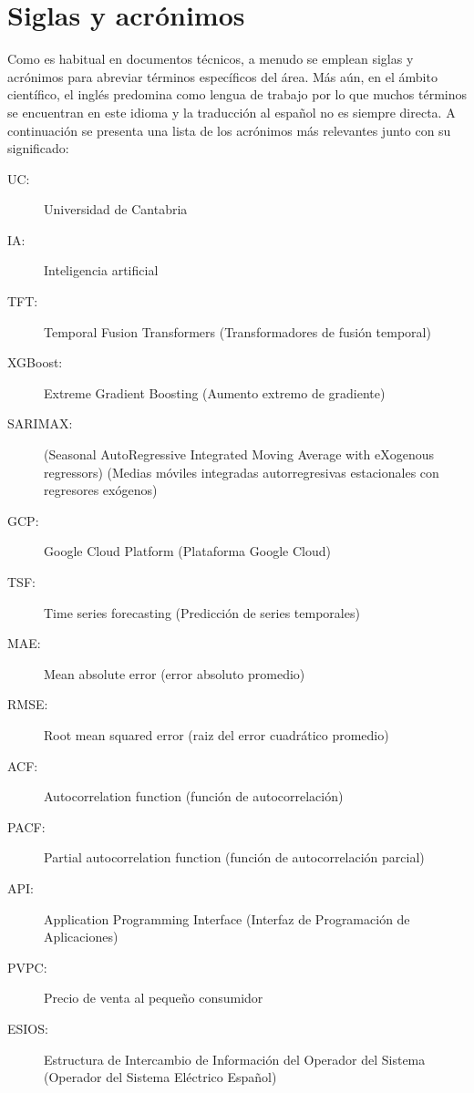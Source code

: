\clearpage
\hypersetup{linkcolor=black}
\tableofcontents\clearpage
\listoffigures\clearpage
\hypersetup{linkcolor=linkscolor}

\chapter*{Siglas y acrónimos}
%
%
Como es habitual en documentos técnicos, a menudo se emplean siglas y acrónimos para abreviar términos específicos del área. Más aún, en el ámbito científico, el inglés predomina como lengua de trabajo por lo que muchos términos se encuentran en este idioma y la traducción al español no es siempre directa. A continuación se presenta una lista de los acrónimos más relevantes junto con su significado:
%
%
\begin{description}
    \item[UC:] Universidad de Cantabria
    \item[IA:] Inteligencia artificial
    \item[TFT:]  Temporal Fusion Transformers (Transformadores de fusión temporal)
    \item[XGBoost:] Extreme Gradient Boosting (Aumento extremo de gradiente)
    \item[SARIMAX:] (Seasonal AutoRegressive Integrated Moving Average with eXogenous regressors) (Medias móviles integradas autorregresivas estacionales con regresores exógenos)
    \item[GCP:] Google Cloud Platform (Plataforma Google Cloud)
    \item[TSF:] Time series forecasting (Predicción de series temporales)
    \item[MAE:] Mean absolute error (error absoluto promedio)
    \item[RMSE:] Root mean squared error (raiz del error cuadrático promedio)
    \item[ACF:] Autocorrelation function (función de autocorrelación)
    \item[PACF:] Partial autocorrelation function (función de autocorrelación parcial)
    \item[API:] Application Programming Interface (Interfaz de Programación de Aplicaciones)
    \item[PVPC:] Precio de venta al pequeño consumidor 
    \item[ESIOS:] Estructura de Intercambio de Información del Operador del Sistema (Operador del Sistema Eléctrico Español)  
\end{description}

